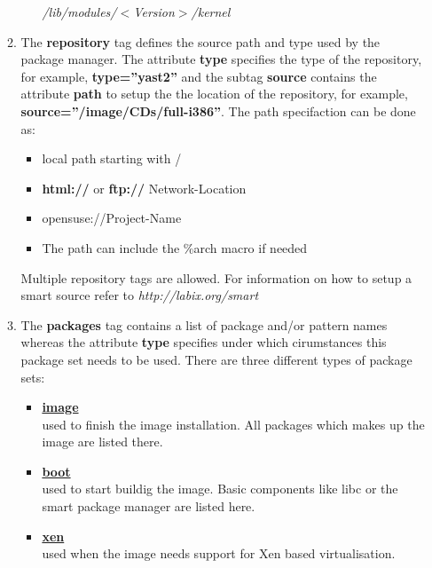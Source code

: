 \begin{itemize}
\begin{enumerate}
\begin{itemize}
                      \textit{/lib/modules/$<$Version$>$/kernel}
                \end{itemize}
          \item The \textbf{repository} tag defines the source path and
                type used by the package manager. The attribute
                \textbf{type} specifies the
                type of the repository, for example,
                \textbf{type=''yast2''} and the subtag \textbf{source}
                contains the attribute \textbf{path} to setup the
                the location of the repository, for example,
                \textbf{source=''/image/CDs/full-i386''}. The path
                specifaction can be done as:
                \begin{itemize}
                \item local path starting with /
                \item \textbf{html://} or \textbf{ftp://} Network-Location
                \item opensuse://Project-Name
                \item The path can include the \%arch macro if needed
                \end{itemize}
                Multiple repository
                tags are allowed. For information on how to setup a smart
                source refer to \textit{http://labix.org/smart}
		  \item The \textbf{packages} tag contains a list of package and/or
				pattern names whereas the attribute \textbf{type} specifies
				under which cirumstances this package set needs to be used.
				There are three different types of package sets:
                \begin{itemize}
                \item \textbf{\underline{image}}\\
                      used to finish the image installation. All packages
                      which makes up the image are listed there.
                \item \textbf{\underline{boot}}\\
                      used to start buildig the image. Basic components
                      like libc or the smart package manager are listed
                      here.
                \item \textbf{\underline{xen}}\\
                      used when the image needs support for Xen based
                      virtualisation.

\end{itemize}
\end{enumerate}
\end{itemize}
